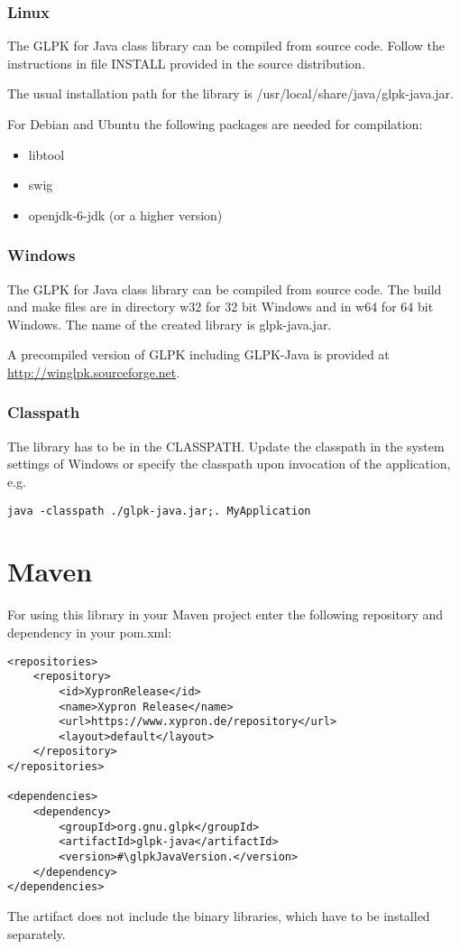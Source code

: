 \documentclass[a4paper,11pt]{report}
\newcommand{\glpkJavaVersion}{1.4.0}
\begin{document}
\subsection{Linux}
The GLPK for Java class library can be compiled from source code. Follow the instructions in file INSTALL provided in the source distribution.

The usual installation path for the library is /usr/local/share/java/glpk-java.jar.

For Debian and Ubuntu the following packages are needed for compilation:
\begin{itemize}
	\item libtool
	\item swig
	\item openjdk-6-jdk (or a higher version)
\end{itemize}
\subsection{Windows}
The GLPK for Java class library can be compiled from source code. The build and make files are in directory w32 for 32 bit Windows and in w64 for 64 bit Windows. The name of the created library is glpk-java.jar.

A precompiled version of GLPK including GLPK-Java is provided at \linebreak\href{http://winglpk.sourceforge.net}{http://winglpk.sourceforge.net}.

\subsection{Classpath}
The library has to be in the CLASSPATH. Update the classpath in the system settings of Windows or specify the classpath upon invocation of the application, e.g.
\begin{verbatim}
java -classpath ./glpk-java.jar;. MyApplication
\end{verbatim}
\chapter{Maven}
For using this library in your Maven project enter the following repository and dependency in your pom.xml:
\begin{lstlisting}
<repositories>
    <repository>
        <id>XypronRelease</id>
        <name>Xypron Release</name>
        <url>https://www.xypron.de/repository</url>
        <layout>default</layout>
    </repository>
</repositories>

<dependencies>
    <dependency>
        <groupId>org.gnu.glpk</groupId>
        <artifactId>glpk-java</artifactId>
        <version>#\glpkJavaVersion.</version>
    </dependency>
</dependencies>
\end{lstlisting}
The artifact does not include the binary libraries, which have to be installed separately.
\end{document}
